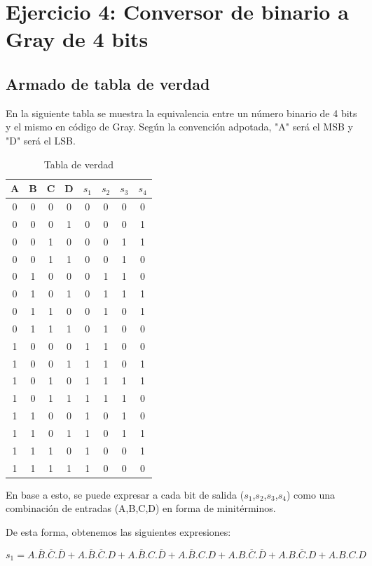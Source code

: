 \section{Ejercicio 4: Conversor de binario a Gray de 4 bits}
\subsection{Armado de tabla de verdad}
En la siguiente tabla se muestra la equivalencia entre un n\'umero binario de 4 bits y el mismo en c\'odigo de Gray. Seg\'un la convenci\'on adpotada, "A" ser\'a el MSB y "D" ser\'a el LSB.

\begin{table}[h!]\caption{Tabla de verdad}
\centering
\begin{tabular}{cccc|cccc}
A & B & C & D & $s_{1}$ & $s_{2}$ & $s_{3}$ & $s_{4}$ \\ \hline
0 & 0 & 0 & 0 & 0  & 0  & 0  & 0  \\
0 & 0 & 0 & 1 & 0  & 0  & 0  & 1  \\
0 & 0 & 1 & 0 & 0  & 0  & 1  & 1  \\
0 & 0 & 1 & 1 & 0  & 0  & 1  & 0  \\
0 & 1 & 0 & 0 & 0  & 1  & 1  & 0  \\
0 & 1 & 0 & 1 & 0  & 1  & 1  & 1  \\
0 & 1 & 1 & 0 & 0  & 1  & 0  & 1  \\
0 & 1 & 1 & 1 & 0  & 1  & 0  & 0  \\
1 & 0 & 0 & 0 & 1  & 1  & 0  & 0  \\
1 & 0 & 0 & 1 & 1  & 1  & 0  & 1  \\
1 & 0 & 1 & 0 & 1  & 1  & 1  & 1  \\
1 & 0 & 1 & 1 & 1  & 1  & 1  & 0  \\
1 & 1 & 0 & 0 & 1  & 0  & 1  & 0  \\
1 & 1 & 0 & 1 & 1  & 0  & 1  & 1  \\
1 & 1 & 1 & 0 & 1  & 0  & 0  & 1  \\
1 & 1 & 1 & 1 & 1  & 0  & 0  & 0 
\end{tabular}
\end{table}

En base a esto, se puede expresar a cada bit de salida ($s_{1}$,$s_{2}$,$s_{3}$,$s_{4}$) como una combinación de entradas (A,B,C,D) en forma de minitérminos.

De esta forma, obtenemos las siguientes expresiones:

\begin{equation}\label{s1_mini}
    s_{1} = A.\overline{B}.\overline{C}.\overline{D} +A.\overline{B}.\overline{C}.D+A.\overline{B}.C.\overline{D}+A.\overline{B}.C.D+A.B.\overline{C}.\overline{D}+A.B.\overline{C}.D+A.B.C.D
\end{equation}

